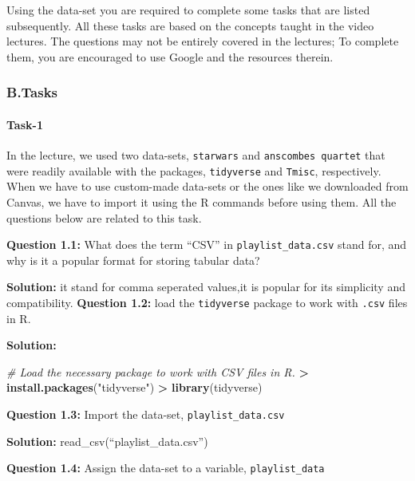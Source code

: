 \documentclass[
]{article}
\newenvironment{Shaded}{\begin{snugshade}}{\end{snugshade}}
\newcommand{\CommentTok}[1]{\textcolor[rgb]{0.56,0.35,0.01}{\textit{#1}}}
\newcommand{\FunctionTok}[1]{\textcolor[rgb]{0.13,0.29,0.53}{\textbf{#1}}}
\newcommand{\NormalTok}[1]{#1}
\newcommand{\SpecialCharTok}[1]{\textcolor[rgb]{0.81,0.36,0.00}{\textbf{#1}}}
\newcommand{\StringTok}[1]{\textcolor[rgb]{0.31,0.60,0.02}{#1}}
\begin{document}
Using the data-set you are required to complete some tasks that are
listed subsequently. All these tasks are based on the concepts taught in
the video lectures. The questions may not be entirely covered in the
lectures; To complete them, you are encouraged to use Google and the
resources therein.

\hypertarget{b.tasks}{%
\subsubsection{B.Tasks}\label{b.tasks}}

\hypertarget{task-1}{%
\paragraph{Task-1}\label{task-1}}

In the lecture, we used two data-sets, \texttt{starwars} and
\texttt{anscombe\textquotesingle{}s\ quartet} that were readily
available with the packages, \texttt{tidyverse} and \texttt{Tmisc},
respectively. When we have to use custom-made data-sets or the ones like
we downloaded from Canvas, we have to import it using the R commands
before using them. All the questions below are related to this task.

\textbf{Question 1.1:} What does the term ``CSV'' in
\texttt{playlist\_data.csv} stand for, and why is it a popular format
for storing tabular data?

\textbf{Solution:} it stand for comma seperated values,it is popular for
its simplicity and compatibility. \textbf{Question 1.2:} load the
\texttt{tidyverse} package to work with \texttt{.csv} files in R.

\textbf{Solution:}

\begin{Shaded}
\begin{Highlighting}[]
\CommentTok{\# Load the necessary package to work with CSV files in R.}
\SpecialCharTok{\textgreater{}} \FunctionTok{install.packages}\NormalTok{(}\StringTok{"tidyverse"}\NormalTok{)}
\SpecialCharTok{\textgreater{}} \FunctionTok{library}\NormalTok{(tidyverse)}
\end{Highlighting}
\end{Shaded}

\textbf{Question 1.3:} Import the data-set, \texttt{playlist\_data.csv}

\textbf{Solution:} read\_csv(``playlist\_data.csv'')

\textbf{Question 1.4:} Assign the data-set to a variable,
\texttt{playlist\_data}
\end{document}
